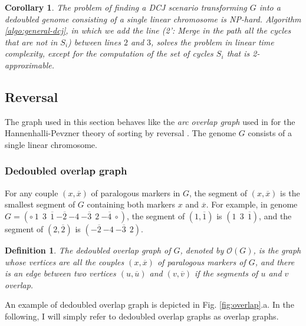 \documentclass[11pt,final,twoside,nofrench]{thlifl}
\newcommand{\snd}[1]{ \ensuremath{\overline{#1}} }
\newcommand{\msnd}[1]{ \ensuremath{{-\overline{#1}}} }
\newtheorem{definition}{Definition}
\newtheorem{corollary}{Corollary}
\begin{document}
\begin{corollary}
\label{lem:hardness-dcj-linear}
The problem of finding a DCJ scenario transforming $G$ into a dedoubled genome 
consisting of a single linear chromosome is NP-hard.
Algorithm \ref{algo:general-dcj}, in which we add the line 
(2': Merge in the path all the cycles that are not in $S_i$)
between lines $2$ and $3$, solves the problem in linear time complexity, 
except for the computation of the set of cycles $S_i$ that is 2-approximable.
\end{corollary}

\subsection{Reversal}
\label{sec:Reversal-dedoubling}

The graph used in this section behaves like the \emph{arc overlap graph}
used in \cite{B-05} for the Hannenhalli-Pevzner theory of sorting by 
reversal \cite{HP-95}. The genome $G$ consists of a single linear
chromosome.

\subsubsection{Dedoubled overlap graph}

For any couple $(x,\snd{x})$ of paralogous markers in $G$, the segment of $(x,\snd{x})$ is the smallest segment of $G$
containing both markers $x$ and $\snd{x}$. For example, in genome 
$G=(\circ ~ 1~~3~~\snd{1}~\msnd{2}~{-4}~ \msnd{3}~~2~\msnd{4}~ {\circ})$, the 
segment of  $(1,\snd{1})$ is $(1~~3~~\snd{1})$, and the segment of 
$(2,\snd{2})$ is $(\msnd{2}~{-4}~ \msnd{3}~~2)$.

\begin{definition}
The \emph{dedoubled overlap graph} of $G$, denoted by $\mathcal{O}(G)$, 
is the graph whose vertices are all the couples $(x,\snd{x})$ of paralogous 
markers of $G$, and there is an edge between two vertices  $(u,\snd{u})$ and  
$(v,\snd{v})$ if the segments of $u$ and $v$ overlap. 
\end{definition}

An example of dedoubled overlap graph is depicted in Fig. \ref{fig:overlap}.a.
In the following, I will simply refer to dedoubled overlap graphs as
overlap graphs.
\end{document}
